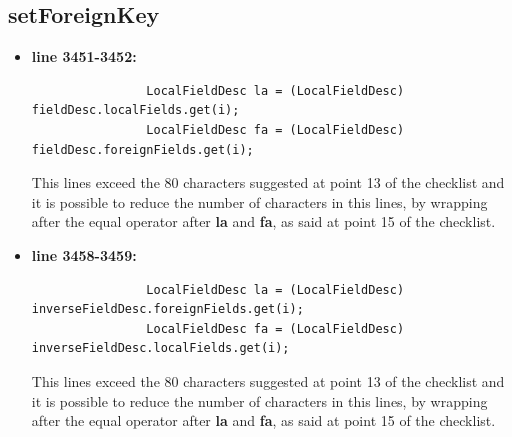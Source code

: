 \documentclass[18pt,oneside,a4paper, titlepage]{article}
\begin{document}
		\subsection{setForeignKey}
			\begin{itemize}
				\item \textbf{line 3451-3452:} \begin{lstlisting}
				LocalFieldDesc la = (LocalFieldDesc) fieldDesc.localFields.get(i);
				LocalFieldDesc fa = (LocalFieldDesc) fieldDesc.foreignFields.get(i);
				\end{lstlisting}
				\vspace{0.1cm}
				This lines exceed the 80 characters suggested at point 13 of the checklist and it is possible to reduce the number of characters in this lines, by wrapping after the equal operator after \textbf{la} and \textbf{fa}, as said at point 15 of the checklist.
				\item \textbf{line 3458-3459:} \begin{lstlisting}
				LocalFieldDesc la = (LocalFieldDesc) inverseFieldDesc.foreignFields.get(i);
				LocalFieldDesc fa = (LocalFieldDesc) inverseFieldDesc.localFields.get(i);
				\end{lstlisting}
				\vspace{0.1cm}
				This lines exceed the 80 characters suggested at point 13 of the checklist and it is possible to reduce the number of characters in this lines, by wrapping after the equal operator after \textbf{la} and \textbf{fa}, as said at point 15 of the checklist.
			\end{itemize}
\end{document}
